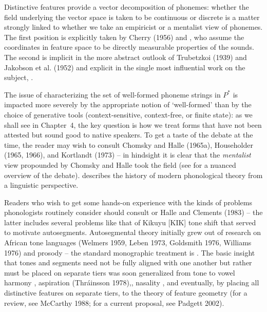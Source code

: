 Distinctive features provide a vector decomposition of phonemes: whether the
field underlying the vector space is taken to be continuous or discrete is a
matter strongly linked to whether we take an empiricist or a mentalist view of
phonemes. The first position is explicitly taken by Cherry (1956) and
\nocite{Cherry:1956} , who assume the coordinates in
feature space to be directly measurable properties of the sounds. The second
is implicit in the more abstract outlook of Trubetzkoi (1939) and Jakobson et
al. (1952) and explicit in the single most influential work on the subject,
.

The issue of characterizing the set of well-formed phoneme strings in $P^*$ is
impacted more severely by the appropriate notion of `well-formed' than by the
choice of generative tools (context-sensitive, context-free, or finite state):
as we shall see in Chapter~4, the key question is how we treat forms that have
not been attested but sound good to native speakers.  To get a taste of the
debate at the time, the reader may wish to consult Chomsky and Halle (1965a),
Householder (1965, 1966), and Kortlandt (1973) -- in hindsight it is clear that
the {\it mentalist} view propounded by Chomsky and Halle took the field (see
 for a nuanced overview of the debate).
 describes the history of modern phonological theory
from a linguistic perspective.
\nocite{Householder:1965}\nocite{Householder:1966}\nocite{Kortlandt:1973}

Readers who wish to get some hands-on experience with the kinds of problems
phonologists routinely consider should consult  or Halle
and Clements (1983) -- \nocite{Halle:1983} the latter includes several
problems like that of Kikuyu [KIK] tone shift \cite{Clements:1979} that served
to motivate autosegments.  Autosegmental theory initially grew out of research
on African tone languages (Welmers 1959, Leben 1973, Goldsmith 1976, Williams
1976)\nocite{Welmers:1959,Leben:1973,Goldsmith:1976,Williams:1976} and prosody
\cite{Firth:1948} -- the standard monographic treatment is
. The basic insight that tones and segments need not
be fully aligned with one another but rather must be placed on separate tiers
was soon generalized from tone to vowel harmony \cite{Clements:1977},
aspiration (Thr\'{a}insson 1978),\nocite{Thra1insson:1978}, nasality
\cite{Hyman:1982}, and eventually, by placing all distinctive features on
separate tiers, to the theory of feature geometry (for a review, see McCarthy
1988; for a current proposal, see Padgett 2002).  \nocite{McCarthy:1988}
  
\nocite{Padgett:2002}

